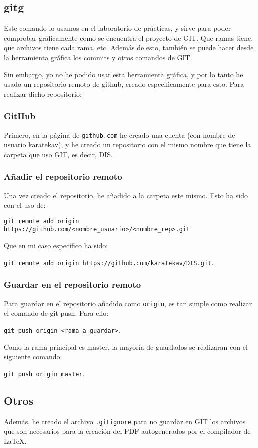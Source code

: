 \documentclass[a4,12pt]{article}
\begin{document}
\subsection{gitg}
Este comando lo usamos en el laboratorio de prácticas, y sirve para poder comprobar gráficamente como se encuentra el proyecto de GIT. Que ramas tiene, que archivos tiene cada rama, etc. Además de esto, también se puede hacer desde la herramienta gráfica los commits y otros comandos de GIT.

\bigskip
Sin embargo, yo no he podido usar esta herramienta gráfica, y por lo tanto he usado un repositorio remoto de github, creado especificamente para esto. Para realizar dicho repositorio:

\subsubsection{GitHub}
Primero, en la página de \texttt{github.com} he creado una cuenta (con nombre de usuario karatekav), y he creado un repositorio con el mismo nombre que tiene la carpeta que uso GIT, es decir, DIS.

\subsubsection{Añadir el repositorio remoto}
Una vez creado el repositorio, he añadido a la carpeta este mismo. Esto ha sido con el uso de: 

\noindent\texttt{git remote add origin https://github.com/<nombre\_usuario>/<nombre\_rep>.git} 

Que en mi caso específico ha sido: 

\noindent\texttt{git remote add origin https://github.com/karatekav/DIS.git}.

\subsubsection{Guardar en el repositorio remoto}
Para guardar en el repositorio añadido como \texttt{origin}, es tan simple como realizar el comando de git push. Para ello:

\noindent\texttt{git push origin <rama\_a\_guardar>}.

Como la rama principal es master, la mayoría de guardados se realizaran con el siguiente comando:

\noindent\texttt{git push origin master}.

\subsection{Otros}
Además, he creado el archivo \texttt{.gitignore} para no guardar en GIT los archivos que son necesarios para la creación del PDF autogenerados por el compilador de \LaTeX .
\end{document}
